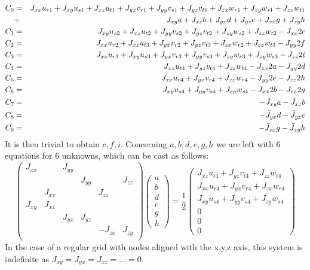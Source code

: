 \begin{eqnarray}
C_0 &=&
J_{xx} u_{r1} + J_{xy} u_{s1} + J_{xz} u_{t1} + 
J_{yx} v_{r1} + J_{yy} v_{s1} + J_{yz} v_{t1} + 
J_{zx} w_{r1} + J_{zy} w_{s1} + J_{zz} w_{t1} \nn\\
&+&  J_{xy} a + J_{xz} b + J_{yx} d + J_{yz} e + J_{zx} g + J_{zy} h \nn\\
C_1 &=& 
J_{xy} u_{s2} + J_{xz} u_{t2} + 
J_{yy} v_{s2} + J_{yz} v_{t2} + 
J_{zy} w_{s2} + J_{zz} w_{t2} -J_{xx} 2c \nn \\ %
C_2 &=&
J_{xx} u_{r2} + J_{xz} u_{t3} +
J_{yx} v_{r2} + J_{yz} v_{t3} +
J_{zx} w_{r2} + J_{zz} w_{t3} -J_{yy} 2f \nn\\ %
C_3 &=&
J_{xx} u_{r3} + J_{xy} u_{s3} +
J_{yx} v_{r3} + J_{yy} v_{s3} +
J_{zy} w_{r3} + J_{zy} w_{s3} -J_{zz} 2i \nn\\ %
C_4 &=& J_{xz} u_{t4} + J_{yz} v_{t4} + J_{zz} w_{t4} -J_{xx} 2a - J_{yy} 2d  \nn\\ %
C_5 &=& J_{xx} u_{r4} + J_{yx} v_{r4} + J_{zx} w_{r4} -J_{yy} 2e - J_{zz} 2h  \nn\\ %
C_6 &=& J_{xy} u_{s4} + J_{yy} v_{s4} + J_{zy} w_{s4} -J_{xx} 2b - J_{zz} 2g  \nn\\ %
C_7 &=& - \tilde{J}_{xy} a - \tilde{J}_{xz} b  \nn\\ %
C_8 &=& - \tilde{J}_{yx} d - \tilde{J}_{yz} e  \nn\\ %
C_9 &=& - \tilde{J}_{zx} g - \tilde{J}_{zy} h  \nn   %
\end{eqnarray}
It is then trivial to obtain $c,f,i$. 
Concerning $a,b,d,e,g,h$ we are left with 6 equations for 6 unknowns, which can be cast as follows:
\[
\left(
\begin{array}{cccccc}
J_{xx} & & J_{yy} & & & \\
 & & & J_{yy} & &  J_{zz}\\ 
 & J_{xx} & & & J_{zz} & \\ 
J_{xy} &  J_{xz} & & & & \\ 
 & & J_{yx} & J_{yz} & \\ 
 & & & & -J_{zx} & J_{zy} \\ 
\end{array}
\right)
\left(
\begin{array}{c}
a \\b\\ d\\ e\\ g\\ h
\end{array}
\right)
=
\frac{1}{2}
\left(
\begin{array}{c}
 J_{xz} u_{t4} + J_{yz} v_{t4} + J_{zz} w_{t4} \\
 J_{xx} u_{r4} + J_{yx} v_{r4} + J_{zx} w_{r4} \\
 J_{xy} u_{s4} + J_{yy} v_{s4} + J_{zy} w_{s4} \\
 0 \\ 0 \\  0
\end{array}
\right)
\]
In the case of a regular grid with nodes aligned with the x,y,z axis, this 
system is indefinite as $J_{xy}=J_{yx}=J_{xz}=...=0$.

